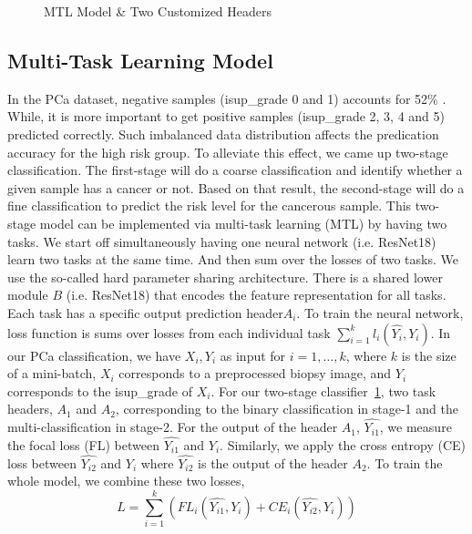 \documentclass[10pt,twocolumn,letterpaper]{article}
\begin{document}
\begin{figure}[t]
\begin{center}
\end{center}
   \caption{MTL Model \& Two Customized Headers}
\label{fig:mtl model}
\end{figure}
\subsection{Multi-Task Learning Model}
In the PCa dataset, negative samples (isup\_grade 0 and 1) accounts for 52\% . While, it is more important to get positive samples (isup\_grade 2, 3, 4 and 5) predicted correctly. Such imbalanced data distribution affects the predication accuracy for the high risk group. To alleviate this effect, we came up two-stage classification. The first-stage will do a coarse classification and identify whether a given sample has a cancer or not. Based on that result, the second-stage will do a fine classification to predict the risk level for the cancerous sample. This two-stage model can be implemented via multi-task learning (MTL) by having two tasks.  
We start off simultaneously having one neural network (i.e. ResNet18) learn two tasks at the same time. And then sum over the losses of two tasks. We use the so-called hard parameter sharing architecture\cite{WuZC:2005.00944}. There is a shared lower module $B$ (i.e. ResNet18) that encodes the feature representation for all tasks. Each task has a specific output prediction header$A_i$. To train the neural network, loss function is sums over losses from each individual task $\sum^k_{i=1}l_i(\hat{Y_i},Y_i)$. In our PCa classification, we have $X_i, Y_i$ as input for $i=1,\dots,k$, where $k$ is the size of a mini-batch, $X_i$ corresponds to a preprocessed biopsy image, and $Y_i$ corresponds to the isup\_grade of $X_i$. For our two-stage classifier~\ref{fig:mtl model}, two task headers, $A_1$ and $A_2$, corresponding to the binary classification in stage-1 and the multi-classification in stage-2. For the output of the header $A_1$, $\hat{Y_{i1}}$, we measure the focal loss (FL)\cite{LinGGHD:1708.02002} between $\hat{Y_{i1}}$ and $Y_{i}$. Similarly, we apply the cross entropy (CE) loss between $\hat{Y_{i2}}$ and $Y_{i}$ where $\hat{Y_{i2}}$ is the output of the header $A_2$. To train the whole model, we combine these two losses,
\begin{equation}
L = \sum^k_{i=1}(FL_i(\hat{Y_{i1}},Y_i) + CE_i(\hat{Y_{i2}},Y_i))
\end{equation}
\end{document}
